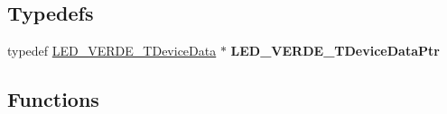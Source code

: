 \subsection*{Typedefs}
\begin{DoxyCompactItemize}
\item 
typedef \hyperlink{struct_l_e_d___v_e_r_d_e___t_device_data}{L\+E\+D\+\_\+\+V\+E\+R\+D\+E\+\_\+\+T\+Device\+Data} $\ast$ {\bfseries L\+E\+D\+\_\+\+V\+E\+R\+D\+E\+\_\+\+T\+Device\+Data\+Ptr}\hypertarget{group___l_e_d___v_e_r_d_e__module_gaff16a1bad9146fda199ba619aa756796}{}\label{group___l_e_d___v_e_r_d_e__module_gaff16a1bad9146fda199ba619aa756796}

\end{DoxyCompactItemize}
\subsection*{Functions}
